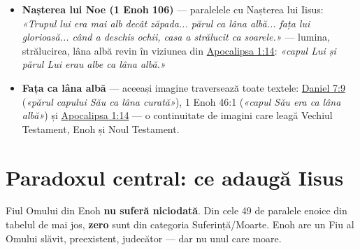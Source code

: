 \documentclass[12pt,a4paper,twoside,openany]{book}
\begin{document}
\begin{itemize}
\begin{center}
\small
\begin{tabular}{L{5.3cm}L{6.2cm}L{3.4cm}}
\toprule
\textbf{\href{https://bibliaortodoxa.ro/carte.php?id=55\&cap=17\#2}{Matei 17:2}} \newline  \textit{«S-a schimbat la față... și a strălucit fața Lui ca soarele, iar veșmintele Lui s-au făcut albe ca lumina.»} & \textbf{1 Enoh 14:20–21} \newline  \textit{«Veșmântul Său mai strălucitor decât soarele și mai alb decât orice zăpadă. Niciunul din îngeri nu putea privi fața Lui.»} & \textbf{1 Enoh 71:1} \newline  \textit{«Veșmintele lor erau albe, și fețele lor străluceau ca zăpada.»} \\
\bottomrule
\end{tabular}
\end{center}
\normalsize

Plus \textbf{norul luminos} din care vine glasul Tatălui (\href{https://bibliaortodoxa.ro/carte.php?id=55\&cap=17\#5}{Matei 17:5}) — exact ca norii din \href{https://bibliaortodoxa.ro/carte.php?id=16\&cap=7\#13}{Daniel 7:13} și Enoh.
  \item \textbf{Nașterea lui Noe (1 Enoh 106)} — paralelele cu Nașterea lui Iisus: \textit{«Trupul lui era mai alb decât zăpada... părul ca lâna albă... fața lui glorioasă... când a deschis ochii, casa a strălucit ca soarele.»} — lumina, strălucirea, lâna albă revin în viziunea din \href{https://bibliaortodoxa.ro/carte.php?id=4\&cap=1\#13}{Apocalipsa 1:14}: \textit{«capul Lui și părul Lui erau albe ca lâna albă.»}
  \item \textbf{Fața ca lâna albă} — aceeași imagine traversează toate textele: \href{https://bibliaortodoxa.ro/carte.php?id=16\&cap=7\#9}{Daniel 7:9} (\textit{«părul capului Său ca lâna curată»}), 1 Enoh 46:1 (\textit{«capul Său era ca lâna albă»}) și \href{https://bibliaortodoxa.ro/carte.php?id=4\&cap=1\#14}{Apocalipsa 1:14} — o continuitate de imagini care leagă Vechiul Testament, Enoh și Noul Testament.
\end{itemize}

\chapter{Paradoxul central: ce adaugă Iisus}\label{paradox}
Fiul Omului din Enoh \textbf{nu suferă niciodată}. Din cele 49 de paralele enoice din tabelul de mai jos, \textbf{zero} sunt din categoria Suferință/Moarte. Enoh are un Fiu al Omului slăvit, preexistent, judecător — dar nu unul care moare.
\end{document}
